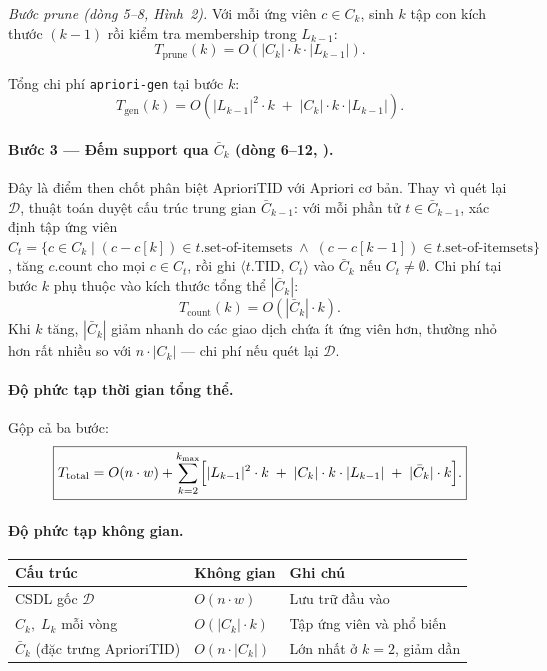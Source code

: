 \documentclass[12pt]{article}
\begin{document}
\textit{Bước prune (dòng 5--8, Hình~2).}
Với mỗi ứng viên $c \in C_k$, sinh $k$ tập con kích thước $(k-1)$ rồi
kiểm tra membership trong $L_{k-1}$:
\[
  T_{\text{prune}}(k) = O\!\left(|C_k| \cdot k \cdot |L_{k-1}|\right).
\]

Tổng chi phí \texttt{apriori-gen} tại bước $k$:
\[
  T_{\text{gen}}(k) = O\!\left(|L_{k-1}|^2 \cdot k \;+\; |C_k| \cdot k \cdot |L_{k-1}|\right).
\]

\paragraph{Bước 3 — Đếm support qua $\bar{C}_k$ (dòng 6--12, ).}
Đây là điểm then chốt phân biệt AprioriTID với Apriori cơ bản.
Thay vì quét lại $\mathcal{D}$, thuật toán duyệt cấu trúc trung gian $\bar{C}_{k-1}$:
với mỗi phần tử $t \in \bar{C}_{k-1}$, xác định tập ứng viên
$C_t = \{c \in C_k \mid (c - c[k]) \in t.\text{set-of-itemsets}
                       \;\wedge\; (c - c[k-1]) \in t.\text{set-of-itemsets}\}$,
tăng $c.\text{count}$ cho mọi $c \in C_t$, rồi ghi $\langle t.\text{TID},\, C_t \rangle$
vào $\bar{C}_k$ nếu $C_t \neq \emptyset$.
Chi phí tại bước $k$ phụ thuộc vào kích thước tổng thể $|\bar{C}_k|$:
\[
  T_{\text{count}}(k) = O\!\left(|\bar{C}_k| \cdot k\right).
\]
Khi $k$ tăng, $|\bar{C}_k|$ giảm nhanh do các giao dịch chứa ít ứng viên hơn,
thường nhỏ hơn rất nhiều so với $n \cdot |C_k|$ — chi phí nếu quét lại $\mathcal{D}$.

\paragraph{Độ phức tạp thời gian tổng thể.}
Gộp cả ba bước:
\[
\boxed{
  T_{\text{total}} = O(n \cdot w)
  + \sum_{k=2}^{k_{\max}}
    \Bigl[
      |L_{k-1}|^2 \cdot k
      \;+\; |C_k| \cdot k \cdot |L_{k-1}|
      \;+\; |\bar{C}_k| \cdot k
    \Bigr].
}
\]

\paragraph{Độ phức tạp không gian.}
\begin{table}[h!]
\centering
\begin{tabular}{lll}
\hline
\textbf{Cấu trúc} & \textbf{Không gian} & \textbf{Ghi chú} \\
\hline
CSDL gốc $\mathcal{D}$   & $O(n \cdot w)$        & Lưu trữ đầu vào \\
$C_k,\; L_k$ mỗi vòng   & $O(|C_k| \cdot k)$   & Tập ứng viên và phổ biến \\
$\bar{C}_k$ (đặc trưng AprioriTID) & $O(n \cdot |C_k|)$ & Lớn nhất ở $k=2$, giảm dần \\
\hline
\end{tabular}
\end{table}
\end{document}
